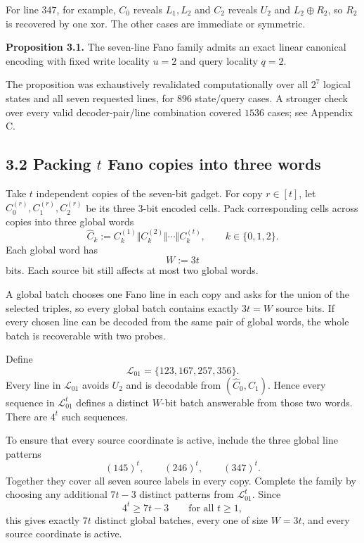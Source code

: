 \documentclass[
]{article}
\begin{document}
For line \(347\), for example, \(C_0\) reveals \(L_1,L_2\) and \(C_2\)
reveals \(U_2\) and \(L_2\oplus R_2\), so \(R_2\) is recovered by one
xor. The other cases are immediate or symmetric.

\textbf{Proposition 3.1.} The seven-line Fano family admits an exact
linear canonical encoding with fixed write locality \(u=2\) and query
locality \(q=2\).

The proposition was exhaustively revalidated computationally over all
\(2^7\) logical states and all seven requested lines, for \(896\)
state/query cases. A stronger check over every valid decoder-pair/line
combination covered \(1536\) cases; see Appendix C.

\hypertarget{packing-t-fano-copies-into-three-words}{%
\subsection{\texorpdfstring{3.2 Packing \(t\) Fano copies into three
words}{3.2 Packing t Fano copies into three words}}\label{packing-t-fano-copies-into-three-words}}

Take \(t\) independent copies of the seven-bit gadget. For copy
\(r\in[t]\), let \(C_0^{(r)},C_1^{(r)},C_2^{(r)}\) be its three 3-bit
encoded cells. Pack corresponding cells across copies into three global
words \[
\widehat C_k
:=
C_k^{(1)}\Vert C_k^{(2)}\Vert\cdots\Vert C_k^{(t)},
\qquad k\in\{0,1,2\}.
\] Each global word has \[
W:=3t
\] bits. Each source bit still affects at most two global words.

A global batch chooses one Fano line in each copy and asks for the union
of the selected triples, so every global batch contains exactly \(3t=W\)
source bits. If every chosen line can be decoded from the same pair of
global words, the whole batch is recoverable with two probes.

Define \[
\mathcal L_{01}=\{123,167,257,356\}.
\] Every line in \(\mathcal L_{01}\) avoids \(U_2\) and is decodable
from \((\widehat C_0,\widehat C_1)\). Hence every sequence in
\(\mathcal L_{01}^t\) defines a distinct \(W\)-bit batch answerable from
those two words. There are \(4^t\) such sequences.

To ensure that every source coordinate is active, include the three
global line patterns \[
(145)^t,\qquad (246)^t,\qquad (347)^t.
\] Together they cover all seven source labels in every copy. Complete
the family by choosing any additional \(7t-3\) distinct patterns from
\(\mathcal L_{01}^t\). Since \[
4^t\ge 7t-3\qquad\text{for all }t\ge1,
\] this gives exactly \(7t\) distinct global batches, every one of size
\(W=3t\), and every source coordinate is active.
\end{document}
